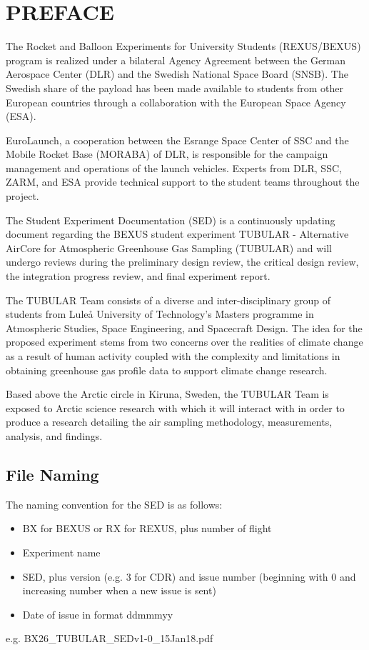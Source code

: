\section*{PREFACE} \markboth{}{}

The Rocket and Balloon Experiments for University Students (REXUS/BEXUS) program is realized under a bilateral Agency Agreement between the German Aerospace Center (DLR) and the Swedish National Space Board (SNSB). The Swedish share of the
payload has been made available to students from other European countries through a collaboration with the European Space Agency (ESA).

EuroLaunch, a cooperation between the Esrange Space Center of SSC and the Mobile Rocket Base (MORABA) of DLR, is responsible for the campaign management and operations of the launch vehicles. Experts from DLR, SSC, ZARM, and ESA provide
technical support to the student teams throughout the project.

The Student Experiment Documentation (SED) is a continuously updating document regarding the BEXUS student experiment TUBULAR - Alternative AirCore for Atmospheric Greenhouse Gas Sampling (TUBULAR) and will undergo reviews during the preliminary design review, the critical design review, the integration progress review, and final experiment report.

The TUBULAR Team consists of a diverse and inter-disciplinary group of students from Luleå University of Technology's Masters programme in Atmospheric Studies, Space Engineering, and Spacecraft Design. The idea for the proposed experiment stems from two concerns over the realities of climate change as a result of human activity coupled with the complexity and limitations in obtaining greenhouse gas profile data to support climate change research.

Based above the Arctic circle in Kiruna, Sweden, the TUBULAR Team is exposed to Arctic science research with which it will interact with in order to produce a research detailing the air sampling methodology, measurements, analysis, and findings.

\subsection*{File Naming}
The naming convention for the SED is as follows:
\begin{itemize}
  \item BX for BEXUS or RX for REXUS, plus number of flight
  \item Experiment name
  \item SED, plus version (e.g. 3 for CDR) and issue number (beginning with 0 and increasing number when a new issue is sent)
  \item Date of issue in format ddmmmyy
\end{itemize}
e.g. BX26\_TUBULAR\_SEDv1-0\_15Jan18.pdf
